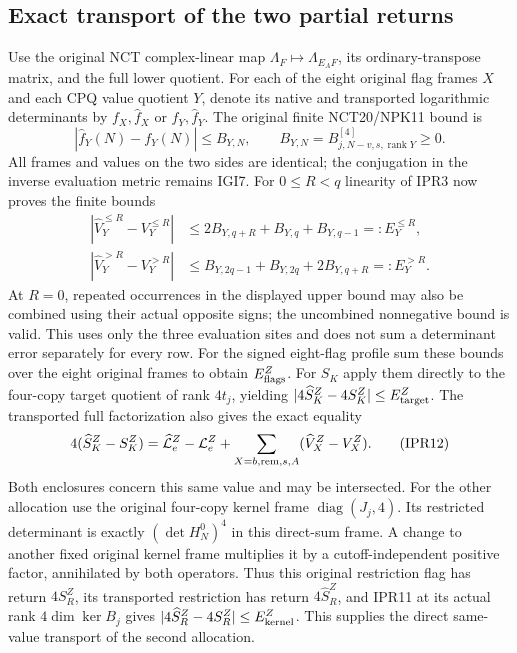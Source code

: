 \documentclass[11pt,a4paper]{article}
\begin{document}
\subsection{Exact transport of the two partial returns}
Use the original NCT complex-linear map
$\Lambda_F\mapsto\Lambda_{E_AF}$, its ordinary-transpose matrix,
and the full lower quotient. For each of the eight original flag
frames $X$ and each CPQ value quotient $Y$, denote its native
and transported logarithmic determinants by $f_X,\widehat f_X$
or $f_Y,\widehat f_Y$. The original finite NCT20/NPK11 bound is
\[
 |\widehat f_Y(N)-f_Y(N)|\le B_{Y,N},\qquad
 B_{Y,N}=B^{[4]}_{j,N-v,s,\operatorname{rank}Y}\ge0 .    \tag{IPR10}
\]
All frames and values on the two sides are identical; the
conjugation in the inverse evaluation metric remains IGI7.
For $0\le R<q$ linearity of IPR3 now proves the finite bounds
\[
\begin{aligned}
 |\widehat V_Y^{\le R}-V_Y^{\le R}|
  &\le 2B_{Y,q+R}+B_{Y,q}+B_{Y,q-1}=:E_Y^{\le R},\\
 |\widehat V_Y^{>R}-V_Y^{>R}|
  &\le B_{Y,2q-1}+B_{Y,2q}+2B_{Y,q+R}=:E_Y^{>R} .
\end{aligned}                                                       \tag{IPR11}
\]
At $R=0$, repeated occurrences in the displayed upper bound
may also be combined using their actual opposite signs; the
uncombined nonnegative bound is valid. This uses only the three
evaluation sites and does not sum a determinant error separately
for every row. For the signed eight-flag profile sum these bounds
over the eight original frames to obtain $E_{\rm flags}^Z$.
For $S_K$ apply them directly to the four-copy target quotient of
rank $4t_j$, yielding $|4\widehat S_K^Z-4S_K^Z|\le E_{\rm target}^Z$.
The transported full factorization also gives the exact equality
\[
 4(\widehat S_K^Z-S_K^Z)
  =\widehat{\mathcal L}_e^Z-\mathcal L_e^Z
       +\sum_{X=b,{\rm rem},s,A}(\widehat V_X^Z-V_X^Z).
                                                               \tag{IPR12}
\]
Both enclosures concern this same value and may be intersected.
For the other allocation use the original four-copy kernel frame
$\operatorname{diag}(J_j,4)$. Its restricted determinant is exactly
$(\det H_N^0)^4$ in this direct-sum frame. A change to another
fixed original kernel frame multiplies it by a cutoff-independent
positive factor, annihilated by both operators. Thus this original
restriction flag has return $4S_R^Z$, its transported restriction
has return $4\widehat S_R^Z$, and IPR11 at its actual rank
$4\dim\ker B_j$ gives
$|4\widehat S_R^Z-4S_R^Z|\le E_{\rm kernel}^Z$.
This supplies the direct same-value transport of the second allocation.
\end{document}
